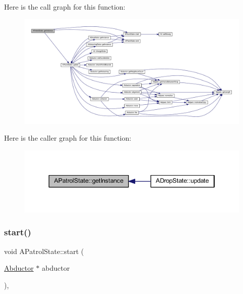 Here is the call graph for this function\+:
\nopagebreak
\begin{figure}[H]
\begin{center}
\leavevmode
\includegraphics[width=350pt]{class_a_patrol_state_a9f5886d57fedbbf0baef217e9dcb674f_cgraph}
\end{center}
\end{figure}
Here is the caller graph for this function\+:
\nopagebreak
\begin{figure}[H]
\begin{center}
\leavevmode
\includegraphics[width=346pt]{class_a_patrol_state_a9f5886d57fedbbf0baef217e9dcb674f_icgraph}
\end{center}
\end{figure}
\mbox{\label{class_a_patrol_state_ad8772aee88fa833b742c722138d33174}} 
\subsubsection{\texorpdfstring{start()}{start()}}
{\footnotesize\ttfamily void A\+Patrol\+State\+::start (\begin{DoxyParamCaption}\item[{\hyperlink{class_abductor}{Abductor} $\ast$}]{abductor }\end{DoxyParamCaption})\hspace{0.3cm}{\ttfamily [override]}, {\ttfamily [virtual]}}




